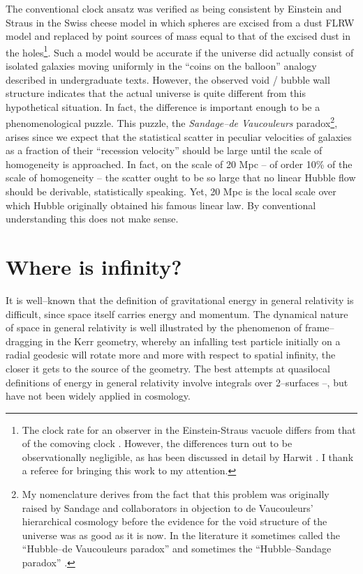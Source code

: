 \documentclass[12pt]{article}
\begin{document}
The conventional clock ansatz was verified as being consistent by Einstein
and Straus \cite{gruyere} in the Swiss cheese model in which spheres are
excised from a dust FLRW model and replaced by point sources of mass equal
to that of the excised dust in the holes\footnote{The clock rate for an
observer in the Einstein-Straus vacuole differs from that of the comoving
clock \cite{schu}. However, the differences turn out to be observationally
negligible, as has been discussed in detail by Harwit \cite{H}. I thank a
referee for bringing this work to my attention.}.
Such a model would be accurate if the universe did actually consist of
isolated galaxies moving uniformly in the ``coins on the balloon'' analogy
described in undergraduate texts. However,
the observed void / bubble wall structure indicates that the actual universe is
quite different from this hypothetical situation. In fact, the difference is
important enough to be a phenomenological puzzle. This puzzle, the
{\em Sandage--de Vaucouleurs} paradox\footnote{My nomenclature derives from
the fact that this problem was originally raised by Sandage and collaborators
\cite{STH} in objection to de Vaucouleurs' hierarchical cosmology \cite{deVau}
before the evidence for the void structure of the universe was as good as it
is now. In the literature it sometimes called the ``Hubble--de Vaucouleurs
paradox'' \cite{paradox1,bary} and sometimes the ``Hubble--Sandage paradox''
\cite{paradox2}.}, arises since we expect that the statistical scatter in
peculiar velocities of galaxies as a fraction of their ``recession velocity''
should be large until the scale of homogeneity is approached. In fact,
on the scale of 20 Mpc -- of order 10\% of the scale of homogeneity -- the
scatter ought to be so large that no linear Hubble flow should be derivable,
statistically speaking. Yet, 20 Mpc is the local scale over which Hubble
originally obtained his famous linear law. By conventional understanding this
does not make sense.

\section{Where is infinity?\label{infty}}

It is well--known that the definition of gravitational energy in general
relativity is difficult, since space itself carries energy and momentum.
The dynamical nature of space in general relativity is well illustrated by
the phenomenon of frame--dragging in the Kerr geometry, whereby an infalling
test particle initially on a radial geodesic will rotate more and more with
respect to spatial infinity, the closer it gets to the source of the
geometry. The best attempts at quasilocal definitions of energy in general
relativity involve integrals over 2--surfaces \cite{quasi_rev}--\cite{quasi2},
but have not been widely applied in cosmology.
\end{document}
